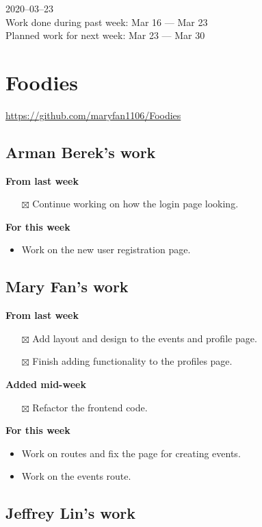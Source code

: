 \documentclass[12pt,letterpaper]{article}
\newcommand{\done}{$\boxtimes$}
\begin{document}
2020--03--23 \\
Work done during past week: Mar 16 --- Mar 23 \\
Planned work for next week: Mar 23 --- Mar 30

\section*{Foodies}
\url{https://github.com/maryfan1106/Foodies}

\subsection*{Arman Berek's work}

\textbf{From last week}
\begin{itemize}
  \item[\done] Continue working on how the login page looking.
\end{itemize}


\textbf{For this week}
\begin{itemize}
  \item Work on the new user registration page.
\end{itemize}


\subsection*{Mary Fan's work}

\textbf{From last week}
\begin{itemize}
  \item[\done] Add layout and design to the events and profile page.
  \item[\done] Finish adding functionality to the profiles page.
\end{itemize}

\textbf{Added mid-week}
\begin{itemize}
  \item[\done] Refactor the frontend code.
\end{itemize}

\textbf{For this week}
\begin{itemize}
  \item Work on routes and fix the page for creating events.
  \item Work on the events route.
\end{itemize}


\subsection*{Jeffrey Lin's work}
\end{document}
